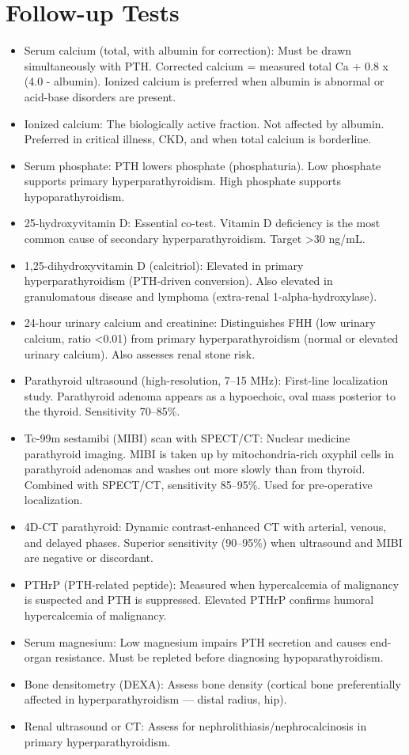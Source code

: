 \section*{Follow-up Tests}
\begin{itemize}
  \item Serum calcium (total, with albumin for correction): Must be drawn simultaneously with PTH. Corrected calcium = measured total Ca + 0.8 x (4.0 - albumin). Ionized calcium is preferred when albumin is abnormal or acid-base disorders are present.
  \item Ionized calcium: The biologically active fraction. Not affected by albumin. Preferred in critical illness, CKD, and when total calcium is borderline.
  \item Serum phosphate: PTH lowers phosphate (phosphaturia). Low phosphate supports primary hyperparathyroidism. High phosphate supports hypoparathyroidism.
  \item 25-hydroxyvitamin D: Essential co-test. Vitamin D deficiency is the most common cause of secondary hyperparathyroidism. Target >30 ng/mL.
  \item 1,25-dihydroxyvitamin D (calcitriol): Elevated in primary hyperparathyroidism (PTH-driven conversion). Also elevated in granulomatous disease and lymphoma (extra-renal 1-alpha-hydroxylase).
  \item 24-hour urinary calcium and creatinine: Distinguishes FHH (low urinary calcium, ratio <0.01) from primary hyperparathyroidism (normal or elevated urinary calcium). Also assesses renal stone risk.
  \item Parathyroid ultrasound (high-resolution, 7--15 MHz): First-line localization study. Parathyroid adenoma appears as a hypoechoic, oval mass posterior to the thyroid. Sensitivity 70--85\%.
  \item Tc-99m sestamibi (MIBI) scan with SPECT/CT: Nuclear medicine parathyroid imaging. MIBI is taken up by mitochondria-rich oxyphil cells in parathyroid adenomas and washes out more slowly than from thyroid. Combined with SPECT/CT, sensitivity 85--95\%. Used for pre-operative localization.
  \item 4D-CT parathyroid: Dynamic contrast-enhanced CT with arterial, venous, and delayed phases. Superior sensitivity (90--95\%) when ultrasound and MIBI are negative or discordant.
  \item PTHrP (PTH-related peptide): Measured when hypercalcemia of malignancy is suspected and PTH is suppressed. Elevated PTHrP confirms humoral hypercalcemia of malignancy.
  \item Serum magnesium: Low magnesium impairs PTH secretion and causes end-organ resistance. Must be repleted before diagnosing hypoparathyroidism.
  \item Bone densitometry (DEXA): Assess bone density (cortical bone preferentially affected in hyperparathyroidism --- distal radius, hip).
  \item Renal ultrasound or CT: Assess for nephrolithiasis/nephrocalcinosis in primary hyperparathyroidism.
\end{itemize}

